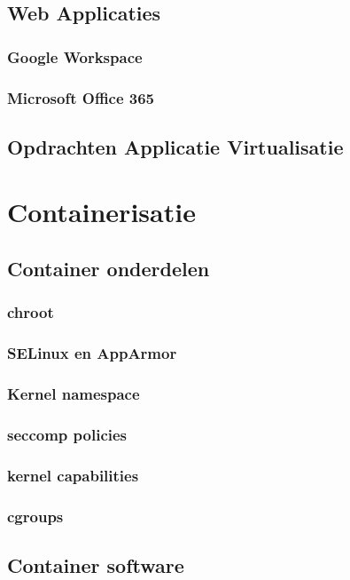 \documentclass[a4paper,12pt,twoside,openright,titlepage]{book}
\begin{document}
\section{Web Applicaties}

\subsection{Google Workspace}

\subsection{Microsoft Office 365}

\section{Opdrachten Applicatie Virtualisatie}


\chapter{Containerisatie}


\section{Container onderdelen}

\subsection{chroot}

\subsection{SELinux en AppArmor}
\subsection{Kernel namespace}

\subsection{seccomp policies}
\subsection{kernel capabilities}
\subsection{cgroups}
\section{Container software}
\end{document}

